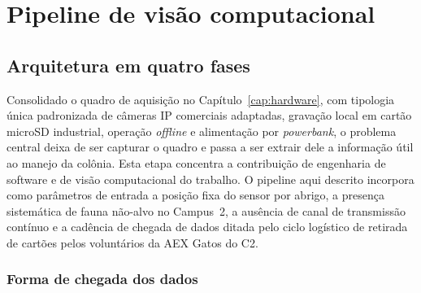 \chapter{Pipeline de visão computacional}
\label{cap:pipeline}

\section{Arquitetura em quatro fases}
\label{sec:pipeline-visao-geral}

Consolidado o quadro de aquisição no Capítulo~\ref{cap:hardware}, com tipologia única padronizada de câmeras IP comerciais adaptadas, gravação local em cartão microSD industrial, operação \textit{offline} e alimentação por \textit{powerbank}, o problema central deixa de ser capturar o quadro e passa a ser extrair dele a informação útil ao manejo da colônia. Esta etapa concentra a contribuição de engenharia de software e de visão computacional do trabalho. O pipeline aqui descrito incorpora como parâmetros de entrada a posição fixa do sensor por abrigo, a presença sistemática de fauna não-alvo no Campus~2, a ausência de canal de transmissão contínuo e a cadência de chegada de dados ditada pelo ciclo logístico de retirada de cartões pelos voluntários da AEX Gatos do C2.

\subsection*{Forma de chegada dos dados}

